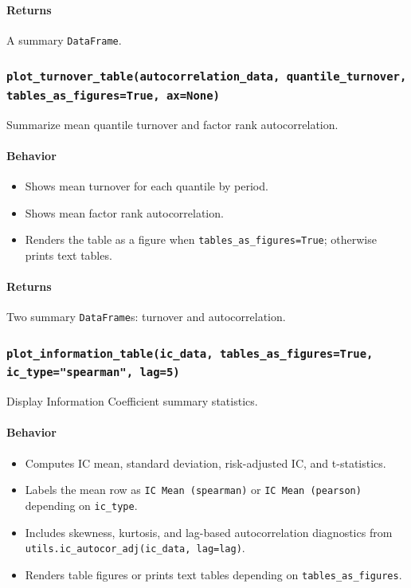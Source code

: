 \documentclass[11pt]{article}
\begin{document}
\paragraph{Returns}
A summary \texttt{DataFrame}.

\subsubsection{\texttt{plot\_turnover\_table(autocorrelation\_data, quantile\_turnover, tables\_as\_figures=True, ax=None)}}
Summarize mean quantile turnover and factor rank autocorrelation.

\paragraph{Behavior}
\begin{itemize}
  \item Shows mean turnover for each quantile by period.
  \item Shows mean factor rank autocorrelation.
  \item Renders the table as a figure when \texttt{tables\_as\_figures=True}; otherwise prints text tables.
\end{itemize}

\paragraph{Returns}
Two summary \texttt{DataFrame}s: turnover and autocorrelation.

\subsubsection{\texttt{plot\_information\_table(ic\_data, tables\_as\_figures=True, ic\_type="spearman", lag=5)}}
Display Information Coefficient summary statistics.

\paragraph{Behavior}
\begin{itemize}
  \item Computes IC mean, standard deviation, risk-adjusted IC, and t-statistics.
  \item Labels the mean row as \texttt{IC Mean (spearman)} or \texttt{IC Mean (pearson)} depending on \texttt{ic\_type}.
  \item Includes skewness, kurtosis, and lag-based autocorrelation diagnostics from \texttt{utils.ic\_autocor\_adj(ic\_data, lag=lag)}.
  \item Renders table figures or prints text tables depending on \texttt{tables\_as\_figures}.
\end{itemize}
\end{document}
